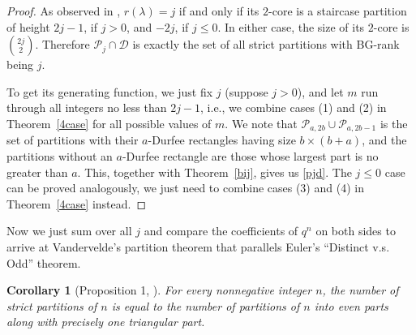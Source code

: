 \documentclass[12pt,reqno]{amsart}
\numberwithin{equation}{section}
\theoremstyle{plain}
\newtheorem{corollary}[theorem]{Corollary}
\theoremstyle{definition}
\newcommand{\p}{\mathcal{P}}
\newcommand{\D}{\mathcal{D}}
\begin{document}
\begin{proof}
As observed in \cite{CJW}, $r(\lambda)=j$ if and only if its $2$-core is a staircase partition of height $2j-1$, if $j>0$, and $-2j$, if $j\le 0$. In either case, the size of its $2$-core is $\binom{2j}{2}$. Therefore $\p_j\cap \D$ is exactly the set of all strict partitions with BG-rank being $j$.

To get its generating function, we just fix $j$ (suppose $j>0$), and let $m$ run through all integers no less than $2j-1$, i.e., we combine cases (1) and (2) in Theorem~\ref{4case} for all possible values of $m$. We note that $\p_{a,2b}\cup\p_{a,2b-1}$ is the set of partitions with their $a$-Durfee rectangles having size $b\times(b+a)$, and the partitions without an $a$-Durfee rectangle are those whose largest part is no greater than $a$. This, together with Theorem~\ref{bij}, gives us \eqref{pjd}. The $j\le 0$ case can be proved analogously, we just need to combine cases (3) and (4) in Theorem~\ref{4case} instead.
\end{proof}

Now we just sum over all $j$ and compare the coefficients of $q^{n}$ on both sides to arrive at Vandervelde's partition theorem that parallels Euler's ``Distinct v.s. Odd'' theorem.
\begin{corollary}[Proposition 1, \cite{Van}]\label{Vandervelde Cor}
For every nonnegative integer $n$, the number of strict partitions of $n$ is equal to the number of partitions of $n$ into even parts along with precisely one triangular part.
\end{corollary}
\end{document}
